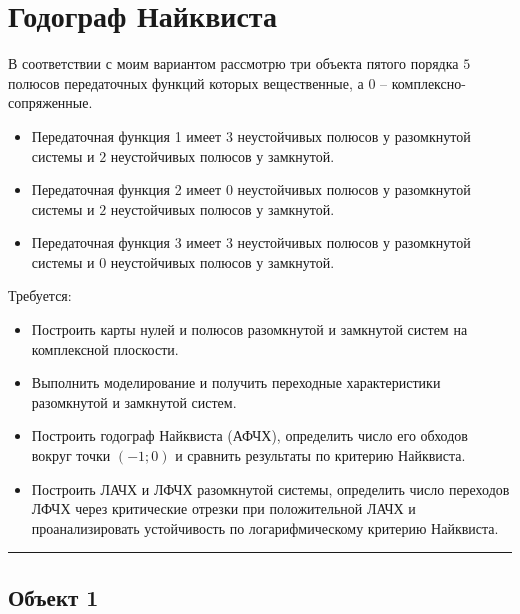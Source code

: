 \documentclass[a4paper,12pt]{article}
\begin{document}
	\newpage
	\tableofcontents
	
	
	\newpage
	\section{Годограф Найквиста}
	
	В соответствии с моим вариантом рассмотрю три объекта пятого порядка \(5\) полюсов передаточных функций которых вещественные, а \(0\) -- комплексно-сопряженные.
	
	\begin{itemize}
		\item Передаточная функция 1 имеет \(3\) неустойчивых полюсов у разомкнутой системы и \(2\) неустойчивых полюсов у замкнутой.
		
		\item Передаточная функция 2 имеет \(0\) неустойчивых полюсов у разомкнутой системы и \(2\) неустойчивых полюсов у замкнутой.
		
		\item Передаточная функция 3 имеет \(3\) неустойчивых полюсов у разомкнутой системы и \(0\) неустойчивых полюсов у замкнутой.
		
	\end{itemize}
	
	
		Требуется:
	
	\begin{itemize}
		\item Построить карты нулей и полюсов разомкнутой и замкнутой систем на комплексной плоскости.
		
		\item Выполнить моделирование и получить переходные характеристики разомкнутой и замкнутой систем.
		
		\item Построить годограф Найквиста (АФЧХ), определить число его обходов вокруг точки $(-1;0)$ и сравнить результаты по критерию Найквиста.
		
		\item Построить ЛАЧХ и ЛФЧХ разомкнутой системы, определить число переходов ЛФЧХ через критические отрезки при положительной ЛАЧХ и проанализировать устойчивость по логарифмическому критерию Найквиста.
	\end{itemize}
	
	\hrule

	\newpage
	\subsection{Объект 1}
	
\end{document}
